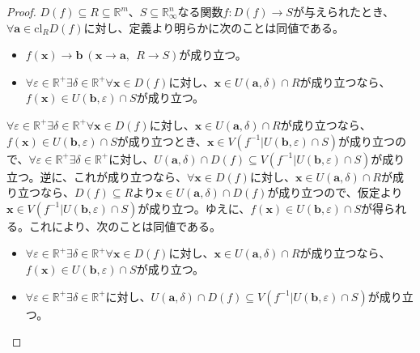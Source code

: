 \documentclass[dvipdfmx]{jsarticle}
\begin{document}
\begin{proof}
$D(f) \subseteq R \subseteq \mathbb{R}^{m}$、$S \subseteq \mathbb{R}_{\infty}^{n}$なる関数$f:D(f) \rightarrow S$が与えられたとき、$\forall\mathbf{a} \in \mathrm{cl}_{R}{D(f)}$に対し、定義より明らかに次のことは同値である。
\begin{itemize}
\item
  $f\left( \mathbf{x} \right) \rightarrow \mathbf{b}\ \left( \mathbf{x} \rightarrow \mathbf{a},\ \ R \rightarrow S \right)$が成り立つ。
\item
  $\forall\varepsilon \in \mathbb{R}^{+}\exists\delta \in \mathbb{R}^{+}\forall\mathbf{x} \in D(f)$に対し、$\mathbf{x} \in U\left( \mathbf{a},\delta \right) \cap R$が成り立つなら、$f\left( \mathbf{x} \right) \in U\left( \mathbf{b},\varepsilon \right) \cap S$が成り立つ。
\end{itemize}
$\forall\varepsilon \in \mathbb{R}^{+}\exists\delta \in \mathbb{R}^{+}\forall\mathbf{x} \in D(f)$に対し、$\mathbf{x} \in U\left( \mathbf{a},\delta \right) \cap R$が成り立つなら、$f\left( \mathbf{x} \right) \in U\left( \mathbf{b},\varepsilon \right) \cap S$が成り立つとき、$\mathbf{x} \in V\left( f^{- 1}|U\left( \mathbf{b},\varepsilon \right) \cap S \right)$が成り立つので、$\forall\varepsilon \in \mathbb{R}^{+}\exists\delta \in \mathbb{R}^{+}$に対し、$U\left( \mathbf{a},\delta \right) \cap D(f) \subseteq V\left( f^{- 1}|U\left( \mathbf{b},\varepsilon \right) \cap S \right)$が成り立つ。逆に、これが成り立つなら、$\forall\mathbf{x} \in D(f)$に対し、$\mathbf{x} \in U\left( \mathbf{a},\delta \right) \cap R$が成り立つなら、$D(f) \subseteq R$より$\mathbf{x} \in U\left( \mathbf{a},\delta \right) \cap D(f)$が成り立つので、仮定より$\mathbf{x} \in V\left( f^{- 1}|U\left( \mathbf{b},\varepsilon \right) \cap S \right)$が成り立つ。ゆえに、$f\left( \mathbf{x} \right) \in U\left( \mathbf{b},\varepsilon \right) \cap S$が得られる。これにより、次のことは同値である。
\begin{itemize}
\item
  $\forall\varepsilon \in \mathbb{R}^{+}\exists\delta \in \mathbb{R}^{+}\forall\mathbf{x} \in D(f)$に対し、$\mathbf{x} \in U\left( \mathbf{a},\delta \right) \cap R$が成り立つなら、$f\left( \mathbf{x} \right) \in U\left( \mathbf{b},\varepsilon \right) \cap S$が成り立つ。
\item
  $\forall\varepsilon \in \mathbb{R}^{+}\exists\delta \in \mathbb{R}^{+}$に対し、$U\left( \mathbf{a},\delta \right) \cap D(f) \subseteq V\left( f^{- 1}|U\left( \mathbf{b},\varepsilon \right) \cap S \right)$が成り立つ。
\end{itemize}

\end{proof}
\end{document}
